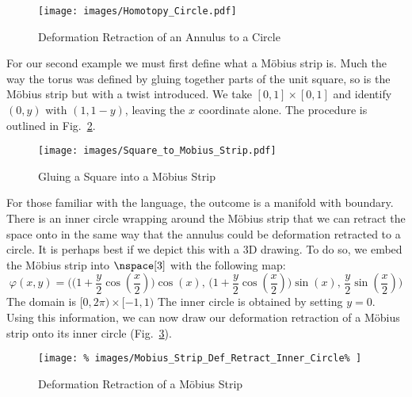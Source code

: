 \documentclass[oneside]{book}                                                  %
\begin{document}
                \begin{figure}[H]
                    \centering
                    \captionsetup{type=figure}
                    \texttt{[image: images/Homotopy\_Circle.pdf]}
                    \caption{Deformation Retraction of an Annulus to a Circle}
                    \label{fig:Def_Retract_Annulus_to_Circle}
                \end{figure}
                For our second example we must first define what a M\"{o}bius
                strip is. Much the way the torus was defined by gluing together
                parts of the unit square, so is the M\"{o}bius strip but with a
                twist introduced. We take $[0,1]\times[0,1]$ and identify
                $(0,y)$ with $(1,1-y)$, leaving the $x$ coordinate alone.
                The procedure is outlined in
                Fig.~\ref{fig:Square_to_Mobius_Strip}.
                \begin{figure}[H]
                    \centering
                    \captionsetup{type=figure}
                    \texttt{[image: images/Square\_to\_Mobius\_Strip.pdf]}
                    \caption{Gluing a Square into a M\"{o}bius Strip}
                    \label{fig:Square_to_Mobius_Strip}
                \end{figure}
                For those familiar with the language, the outcome is a manifold
                with boundary. There is an inner circle wrapping around the
                M\"{o}bius strip that we can retract the space onto in the same
                way that the annulus could be deformation retracted to a circle.
                It is perhaps best if we depict this with a 3D drawing. To do
                so, we embed the M\"{o}bius strip into $\nspace[3]$ with the
                following map:
                \begin{equation}
                    \varphi(x,y)=
                    \Big(\big(1+\frac{y}{2}\cos(\frac{x}{2})\big)\cos(x),\,
                         \big(1+\frac{y}{2}\cos(\frac{x}{2})\big)\sin(x),\,
                         \frac{y}{2}\sin(\frac{x}{2})\Big)
                \end{equation}
                The domain is $[0,2\pi)\times[\minus{1},1)$ The inner circle is
                obtained by setting $y=0$. Using this information, we can now
                draw our deformation retraction of a M\"{o}bius strip onto its
                inner circle (Fig.~\ref{fig:Def_Retract_Mobius_Strip}).
                \begin{figure}[H]
                    \centering
                    \captionsetup{type=figure}
                    \texttt{[image: \%
                        images/Mobius\_Strip\_Def\_Retract\_Inner\_Circle\%
                    ]}
                    \caption{Deformation Retraction of a M\"{o}bius Strip}
                    \label{fig:Def_Retract_Mobius_Strip}
                \end{figure}
\end{document}
